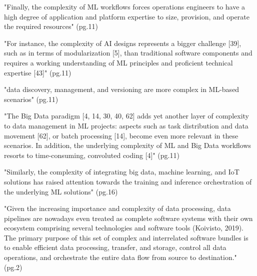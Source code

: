 \parencite{Diaz-De-Arcaya2023ASurvey}

"Finally, the complexity of ML workflows forces operations engineers to
have a high degree of application and platform expertise to size, provision,
and operate the required resources" (pg.11)

"For instance, the complexity of AI designs represents a bigger challenge [39],
such as in terms of modularization [5], than traditional software components
and requires a working understanding of ML principles and proficient technical
expertise [43]" (pg.11)

"data discovery, management, and versioning are more complex in ML-based
scenarios" (pg.11)

"The Big Data paradigm [4, 14, 30, 40, 62] adds yet another layer of complexity
to data management in ML projects: aspects such as task distribution and data
movement [62], or batch processing [14], become even more relevant in these scenarios.
In addition, the underlying complexity of ML and Big Data workflows resorts
to time-consuming, convoluted coding [4]" (pg.11)

"Similarly, the complexity of integrating big data, machine learning,
and IoT solutions has raised attention towards the training and inference
orchestration of the underlying ML solutions" (pg.16)


\parencite{Foidl2024DataDevelopers}
"Given the increasing importance and complexity of data processing,
data pipelines are nowadays even treated as complete software
systems with their own ecosystem comprising several technologies and
software tools (Koivisto, 2019). The primary purpose of this set of
complex and interrelated software bundles is to enable efficient data
processing, transfer, and storage, control all data operations, and
orchestrate the entire data flow from source to destination." (pg.2)


\parencite{Giray2021AChallenges}

